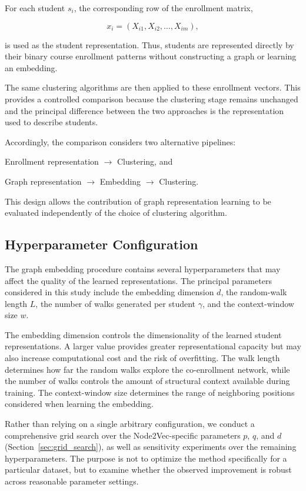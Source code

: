 \documentclass[pdflatex,sn-mathphys-num,iicol]{sn-jnl}%
\theoremstyle{thmstyleone}%
\theoremstyle{thmstyletwo}%
\theoremstyle{thmstylethree}%
\begin{document}
For each student $s_i$, the corresponding row of the enrollment matrix,

$$
x_i=(X_{i1},X_{i2},\ldots,X_{im}),
$$

is used as the student representation. Thus, students are represented directly by their binary course enrollment patterns without constructing a graph or learning an embedding.

The same clustering algorithms are then applied to these enrollment vectors. This provides a controlled comparison because the clustering stage remains unchanged and the principal difference between the two approaches is the representation used to describe students.


Accordingly, the comparison considers two alternative pipelines:

{Enrollment representation}
$\rightarrow$ {Clustering},
and

{Graph representation}
$\rightarrow$
{Embedding}
$\rightarrow$
{Clustering}.

This design allows the contribution of graph representation learning to be evaluated independently of the choice of clustering algorithm.

\subsection{Hyperparameter Configuration}
\label{subsec:hyperparameters}

The graph embedding procedure contains several hyperparameters that may affect the quality of the learned representations. The principal parameters considered in this study include the embedding dimension $d$, the random-walk length $L$, the number of walks generated per student $\gamma$, and the context-window size $w$.

The embedding dimension controls the dimensionality of the learned student representations. A larger value provides greater representational capacity but may also increase computational cost and the risk of overfitting. The walk length determines how far the random walks explore the co-enrollment network, while the number of walks controls the amount of structural context available during training. The context-window size determines the range of neighboring positions considered when learning the embedding.

Rather than relying on a single arbitrary configuration, we conduct a comprehensive grid search over the Node2Vec-specific parameters $p$, $q$, and $d$ (Section~\ref{sec:grid_search}), as well as sensitivity experiments over the remaining hyperparameters. The purpose is not to optimize the method specifically for a particular dataset, but to examine whether the observed improvement is robust across reasonable parameter settings.
\end{document}
